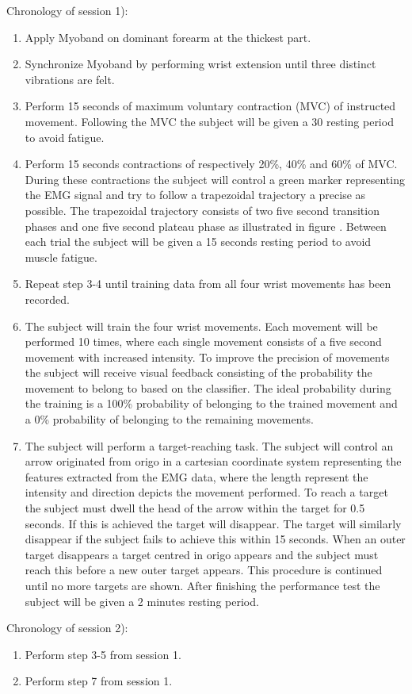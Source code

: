 Chronology of session 1):
\begin{enumerate}
	\item Apply Myoband on dominant forearm at the thickest part.
	\item Synchronize Myoband by performing wrist extension until three distinct vibrations are felt.
	\item Perform 15 seconds of maximum voluntary contraction (MVC) of instructed movement. Following the MVC the subject will be given a 30 resting period to avoid fatigue.
	\item Perform 15 seconds contractions of respectively 20\%, 40\% and 60\% of MVC. During these contractions the subject will control a green marker representing the EMG signal and try to follow a trapezoidal trajectory a precise as possible. The trapezoidal trajectory consists of two five second transition phases and one five second plateau phase as illustrated in figure . Between each trial the subject will be given a 15 seconds resting period to avoid muscle fatigue.
	\item Repeat step 3-4 until training data from all four wrist movements has been recorded.
	\item The subject will train the four wrist movements. Each movement will be performed 10 times, where each single movement consists of a five second movement with increased intensity. To improve the precision of movements the subject will receive visual feedback consisting of the probability the movement to belong to based on the classifier. The ideal probability during the training is a 100\% probability of belonging to the trained movement and a 0\% probability of belonging to the remaining movements. 
	\item The subject will perform a target-reaching task. The subject will control an arrow originated from origo in a cartesian coordinate system representing the features extracted from the EMG data, where the length represent the intensity and direction depicts the movement performed. To reach a target the subject must dwell the head of the arrow within the target for 0.5 seconds. If this is achieved the target will disappear. The target will similarly disappear if the subject fails to achieve this within 15 seconds. When an outer target disappears a target centred in origo appears and the subject must reach this before a new outer target appears. This procedure is continued until no more targets are shown. After finishing the performance test the subject will be given a 2 minutes resting period.
\end{enumerate}


Chronology of session 2):
\begin{enumerate}
	 \item Perform step 3-5 from session 1.
	 \item Perform step 7 from session 1. 
\end{enumerate}
 







